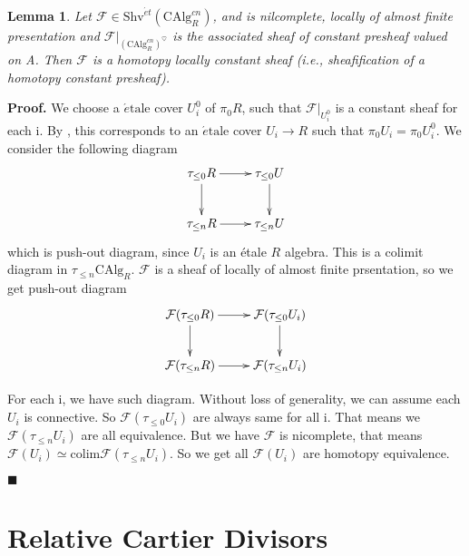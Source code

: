 \documentclass[12pt]{article}
\newtheorem{lemma}[theorem]{Lemma}
\theoremstyle{thry}
\renewenvironment{proof}
{\par \noindent \textbf{Proof.}}
{ \par \hfill $\blacksquare$ \quad \par }
\def  \colim    {\mathrm{colim}}
\def  \CAlg     {\mathrm{CAlg}}
\def  \et       {\acute{e}t}
\def  \etale    {\acute{e}\text{tale}}
\def  \Shv      {\mathrm{Shv}}
\def  \cf       {\mathcal{F}}
\begin{document}
\begin{lemma}\label{constant}
	Let $\cf \in \Shv^{\et}(\CAlg^{cn}_R)$,  and is nilcomplete, locally of almost finite presentation and $\cf|_{(\CAlg^{cn}_R)^{\heartsuit}}$ is  the associated sheaf of constant presheaf valued on A. Then $\cf$ is a homotopy locally constant sheaf (i.e., sheafification of  a homotopy constant presheaf). 	
\end{lemma}	

\begin{proof}
	We choose a  $\etale$ cover $U^0_{i}$ of $\pi_0 R$, such that $\cf|_{U^0_{i}}$ is a constant sheaf for each i.	By \cite[Theorem 7.5.1.11]{lu-HA}, this corresponds  to an $\etale$ cover $U_i \to R$ such that $\pi_0 U_i = \pi_0 U^0_i$.
 We consider the following diagram
	$$
	\xymatrix{
	\tau_{\leq 0} R    \ar[r] \ar[d]  &  \tau_{\leq 0} U  \ar[d]\\
	 \tau_{\leq n}R    \ar[r]              &  \tau_{\leq n}   U
}
	$$
	which is push-out diagram, since $U_i$ is an \'etale  $R$ algebra. This is a  colimit diagram in $\tau_{\leq n} \CAlg_R$.  $\cf$ is  a sheaf  of locally of almost finite prsentation, so we get push-out diagram
	$$
	\xymatrix{
	\cf(\tau_{\leq 0} R)   \ar[r] \ar[d]  &  \cf(\tau_{\leq 0} U_i \ar[d])\\
	 \cf (\tau_{\leq n}R)  \ar[r]              &   \cf(\tau_{\leq n}U_i)
	}
	$$
	
For each i, we have such diagram.  Without loss of generality, we can assume each $U_i$ is connective.  So $\cf(\tau_{\leq 0}U_i)$ are always same for all i.  That means we   $\cf( \tau_{\leq n} U_i)$ are all equivalence.  But we have $\cf$ is nicomplete, that means $\cf(U_i)  \simeq \colim \cf(\tau_{\leq n} U_i)$.  So we get all $\cf(U_i)$ are homotopy equivalence.
\end{proof}








\section{Relative Cartier Divisors}
\end{document}
